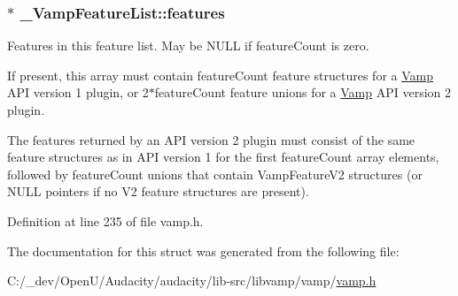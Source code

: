 \subsubsection[{\texorpdfstring{features}{features}}]{$\ast$ \+\_\+\+Vamp\+Feature\+List\+::features}\hypertarget{struct___vamp_feature_list_a103c817094643ac5ff4410768f4f92a7}{}\label{struct___vamp_feature_list_a103c817094643ac5ff4410768f4f92a7}
Features in this feature list. May be N\+U\+LL if feature\+Count is zero.

If present, this array must contain feature\+Count feature structures for a \hyperlink{namespace_vamp}{Vamp} A\+PI version 1 plugin, or 2$\ast$feature\+Count feature unions for a \hyperlink{namespace_vamp}{Vamp} A\+PI version 2 plugin.

The features returned by an A\+PI version 2 plugin must consist of the same feature structures as in A\+PI version 1 for the first feature\+Count array elements, followed by feature\+Count unions that contain Vamp\+Feature\+V2 structures (or N\+U\+LL pointers if no V2 feature structures are present). 

Definition at line 235 of file vamp.\+h.



The documentation for this struct was generated from the following file\+:\begin{DoxyCompactItemize}
\item 
C\+:/\+\_\+dev/\+Open\+U/\+Audacity/audacity/lib-\/src/libvamp/vamp/\hyperlink{vamp_8h}{vamp.\+h}\end{DoxyCompactItemize}
